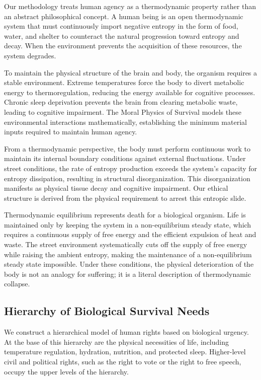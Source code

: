 \documentclass[12pt]{article}
\begin{document}
Our methodology treats human agency as a thermodynamic property rather than an abstract philosophical concept. A human being is an open thermodynamic system that must continuously import negative entropy in the form of food, water, and shelter to counteract the natural progression toward entropy and decay. When the environment prevents the acquisition of these resources, the system degrades.

To maintain the physical structure of the brain and body, the organism requires a stable environment. Extreme temperatures force the body to divert metabolic energy to thermoregulation, reducing the energy available for cognitive processes. Chronic sleep deprivation prevents the brain from clearing metabolic waste, leading to cognitive impairment. The Moral Physics of Survival models these environmental interactions mathematically, establishing the minimum material inputs required to maintain human agency.

From a thermodynamic perspective, the body must perform continuous work to maintain its internal boundary conditions against external fluctuations. Under street conditions, the rate of entropy production exceeds the system's capacity for entropy dissipation, resulting in structural disorganization. This disorganization manifests as physical tissue decay and cognitive impairment. Our ethical structure is derived from the physical requirement to arrest this entropic slide.

Thermodynamic equilibrium represents death for a biological organism. Life is maintained only by keeping the system in a non-equilibrium steady state, which requires a continuous supply of free energy and the efficient expulsion of heat and waste. The street environment systematically cuts off the supply of free energy while raising the ambient entropy, making the maintenance of a non-equilibrium steady state impossible. Under these conditions, the physical deterioration of the body is not an analogy for suffering; it is a literal description of thermodynamic collapse.

\subsection{Hierarchy of Biological Survival Needs}
We construct a hierarchical model of human rights based on biological urgency. At the base of this hierarchy are the physical necessities of life, including temperature regulation, hydration, nutrition, and protected sleep. Higher-level civil and political rights, such as the right to vote or the right to free speech, occupy the upper levels of the hierarchy.
\end{document}
